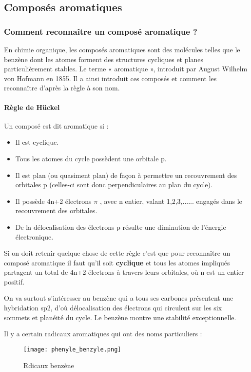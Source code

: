 \documentclass[a4paper, oneside]{book}
\begin{document}
\subsection{Composés aromatiques}
\subsubsection{Comment reconnaître un composé aromatique ?}
En chimie organique, les composés aromatiques sont des molécules telles que le benzène dont les atomes forment des structures cycliques et planes particulièrement stables. Le terme « aromatique », introduit par August Wilhelm von Hofmann en 1855. Il a ainsi introduit ces composés et comment les reconnaître d'après la règle à son nom. 
\paragraph{Règle de Hückel}
Un composé est dit aromatique si :
\begin{itemize}
    \item Il est cyclique.
    \item Tous les atomes du cycle possèdent une orbitale p.
    \item  Il est plan (ou quasiment plan) de façon à permettre un recouvrement des orbitales p (celles-ci sont donc perpendiculaires au plan du cycle).
    \item  Il possède 4n+2 électrons $\pi$ , avec n entier, valant 1,2,3,...... engagés dans le recouvrement des orbitales.
    \item De la délocalisation des électrons p résulte une diminution de l'énergie électronique.
\end{itemize}
Si on doit retenir quelque chose de cette règle c'est que pour reconnaître un composé aromatique il faut qu'il soit \textbf{cyclique} et tous les atomes impliqués partagent un total de 4n+2 électrons à travers leurs orbitales, où n est un entier positif. 

On va surtout s'intéresser au benzène qui a tous ses carbones présentent une hybridation sp2, d'où délocalisation des électrons qui circulent sur les six sommets et planéité du cycle. Le benzène montre une stabilité exceptionnelle.

Il y a certain radicaux aromatiques qui ont des noms particuliers :
\begin{figure}[ht]
    \centering
    \texttt{[image: phenyle\_benzyle.png]}
    \caption{Rdicaux benzène}
    \label{fig:my_label}
\end{figure}
\end{document}
